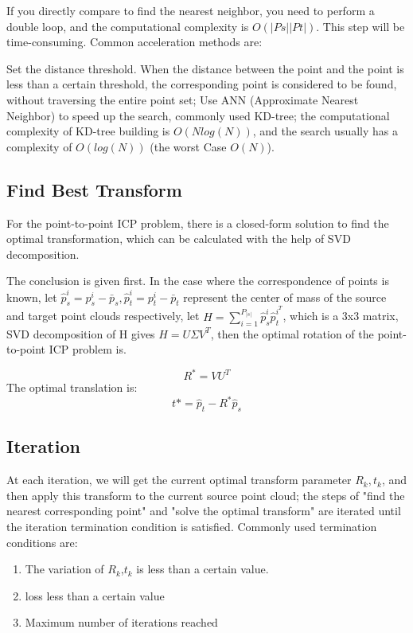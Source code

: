 \documentclass{article} %
\begin{document}
If you directly compare to find the nearest neighbor, you need to perform a double loop, and the computational complexity is $O(|Ps||Pt|)$. This step will be time-consuming. Common acceleration methods are:

Set the distance threshold. When the distance between the point and the point is less than a certain threshold, the corresponding point is considered to be found, without traversing the entire point set;
Use ANN (Approximate Nearest Neighbor) to speed up the search, commonly used KD-tree; the computational complexity of KD-tree building is $O(N log(N))$, and the search usually has a complexity of $O(log(N))$ (the worst Case $O(N)$).

\subsection{Find Best Transform}
For the point-to-point ICP problem, there is a closed-form solution to find the optimal transformation, which can be calculated with the help of SVD decomposition.

The conclusion is given first. In the case where the correspondence of points is known, let $\hat{p}_{s}^{i}=p_{s}^{i}-\bar{p}_{s}, \hat{p}_{t}^{i}=p_{t}^{i}-\bar{p}_{t}$ represent the center of mass of the source and target point clouds respectively, let $H=\sum_{i=1}^{P_{|s|}} \hat{p}_{s}^{i} \hat{p}_{t}^{i^{T}}$, which is a 3x3 matrix, SVD decomposition of H gives $H=U \Sigma V^{T}$, then the optimal rotation of the point-to-point ICP problem is.

$$
R^* = VU^T
$$
The optimal translation is:
$$
t* = \hat{p}_{t}-R^*\hat{p}_s
$$

\subsection{Iteration}
At each iteration, we will get the current optimal transform parameter $R_k,t_k$, and then apply this transform to the current source point cloud; the steps of "find the nearest corresponding point" and "solve the optimal transform" are iterated until the iteration termination condition is satisfied. Commonly used termination conditions are:
\begin{enumerate}
	\item The variation of $R_k$,$t_k$ is less than a certain value.
	\item loss less than a certain value
	\item Maximum number of iterations reached
\end{enumerate}





\end{document}
